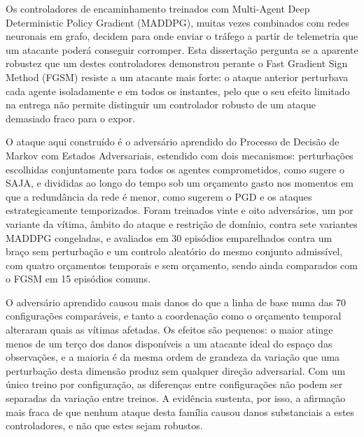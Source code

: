 
%

Os controladores de encaminhamento treinados com Multi-Agent Deep Deterministic Policy
Gradient (MADDPG), muitas vezes combinados com redes neuronais em grafo, decidem para
onde enviar o tráfego a partir de telemetria que um atacante poderá conseguir corromper.
Esta dissertação pergunta se a aparente robustez que um destes controladores demonstrou
perante o Fast Gradient Sign Method (FGSM) resiste a um atacante mais forte: o ataque
anterior perturbava cada agente isoladamente e em todos os instantes, pelo que o seu
efeito limitado na entrega não permite distinguir um controlador robusto de um ataque
demasiado fraco para o expor.

O ataque aqui construído é o adversário aprendido do Processo de Decisão de Markov com
Estados Adversariais, estendido com dois mecanismos: perturbações escolhidas
conjuntamente para todos os agentes comprometidos, como sugere o SAJA, e divididas ao
longo do tempo sob um orçamento gasto nos momentos em que a redundância da rede é menor,
como sugerem o PGD e os ataques estrategicamente temporizados. Foram treinados vinte e
oito adversários, um por variante da vítima, âmbito do ataque e restrição de domínio,
contra sete variantes MADDPG congeladas, e avaliados em 30 episódios emparelhados contra
um braço sem perturbação e um controlo aleatório do mesmo conjunto admissível, com
quatro orçamentos temporais e sem orçamento, sendo ainda comparados com o FGSM em 15
episódios comuns.

O adversário aprendido causou mais danos do que a linha de base numa das 70
configurações comparáveis, e tanto a coordenação como o orçamento temporal alteraram
quais as vítimas afetadas. Os efeitos são pequenos: o maior atinge menos de um terço dos
danos disponíveis a um atacante ideal do espaço das observações, e a maioria é da mesma
ordem de grandeza da variação que uma perturbação desta dimensão produz sem qualquer
direção adversarial. Com um único treino por configuração, as diferenças entre
configurações não podem ser separadas da variação entre treinos. A evidência sustenta,
por isso, a afirmação mais fraca de que nenhum ataque desta família causou danos
substanciais a estes controladores, e não que estes sejam robustos.

